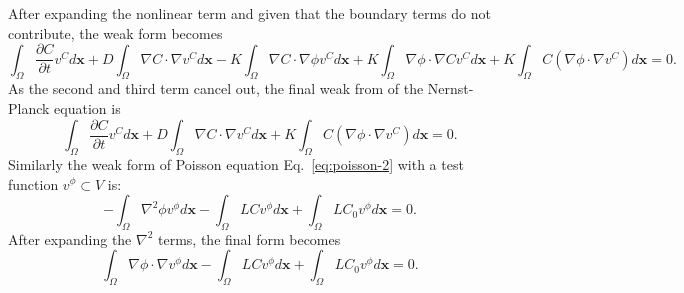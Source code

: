 After expanding the nonlinear term and given that the boundary terms
do not contribute, the weak form becomes
\begin{equation}
  \int_{\Omega}\frac{\partial C}{\partial t}v^C d\mathbf{x}+
  D\int_{\Omega}\nabla C \cdot \nabla v^C d\mathbf{x}-
  K\int_{\Omega}\nabla C \cdot \nabla \phi v^C d\mathbf{x}+
  K\int_{\Omega}\nabla \phi \cdot \nabla C v^C d\mathbf{x}+
  K\int_{\Omega} C \left(\nabla\phi\cdot\nabla v^C\right) d\mathbf{x}=0.
  \label{eq:nernst-planck-weak3}
\end{equation}
As the second and third term cancel out, the final weak from of 
the Nernst-Planck equation is
\begin{equation}
  \int_{\Omega}\frac{\partial C}{\partial t}v^C d\mathbf{x}+
  D\int_{\Omega}\nabla C \cdot \nabla v^C d\mathbf{x}+
  K\int_{\Omega} C \left(\nabla\phi\cdot\nabla v^C\right) d\mathbf{x}=0.
  \label{eq:nernst-planck-weak-final}
\end{equation}
Similarly the weak form of Poisson equation Eq.~\ref{eq:poisson-2}
with a test function $v^\phi\subset V$ is:
\begin{equation}
  -\int_{\Omega}\nabla^2\phi v^\phi d\mathbf{x}-\int_{\Omega}LCv^\phi d\mathbf{x}+
  \int_{\Omega}LC_{0}v^\phi d\mathbf{x}=0.
  \label{eq:poisson-weak1}
\end{equation}
After expanding the $\nabla^2$ terms, the final form becomes
\begin{equation}
  \int_{\Omega}\nabla\phi\cdot\nabla v^\phi d\mathbf{x}-\int_{\Omega}LCv^\phi d\mathbf{x}+
  \int_{\Omega}LC_{0}v^\phi d\mathbf{x}=0.
  \label{eq:poisson-weak-final}
\end{equation}


